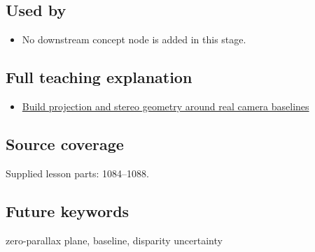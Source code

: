 \subsection{Used by}\label{appendix-0976e86e5b9f-used-by}

\begin{itemize}
\tightlist
\item
  No downstream concept node is added in this stage.
\end{itemize}

\subsection{Full teaching explanation}\label{appendix-0976e86e5b9f-full-teaching-explanation}

\begin{itemize}
\tightlist
\item
  \hyperref[02-foundations-ii-ch035-build-projection-and-stereo-geometry-around-real-camera-baselines]{Build projection and stereo geometry around real camera baselines}
\end{itemize}

\subsection{Source coverage}\label{appendix-0976e86e5b9f-source-coverage}

Supplied lesson parts: 1084--1088.

\subsection{Future keywords}\label{appendix-0976e86e5b9f-future-keywords}

zero-parallax plane, baseline, disparity uncertainty
